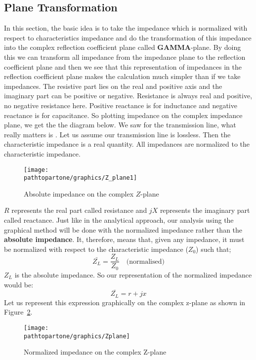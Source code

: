 \subsection{Plane Transformation}
In this section, the basic idea is to take the impedance which is normalized with respect to characteristics impedance and do the transformation of this impedance into the complex reflection coefficient plane called \textbf{GAMMA}-plane. By doing this we can transform all impedance from the impedance plane to the reflection coefficient plane and then we see that this representation of impedances in the reflection coefficient plane makes the calculation much simpler than if we take impedances. The resistive part lies on the real and positive axis and the imaginary part can be positive or negative. Resistance is always real and positive, no negative resistance here. Positive reactance is for inductance and negative reactance is for capacitance. So plotting impedance on the complex impedance plane, we get the the diagram below. We saw for the transmission line, what really matters is . Let us assume our transmission line is lossless. Then the characteristic impedance is a real quantity. All impedances are normalized to the characteristic impedance.
\begin{figure}[h]
\centering
\texttt{[image: \\pathtopartone/graphics/Z\_plane1]}
\caption{Absolute impedance on the complex $Z$-plane}
\label{fig:mjhdj}
\end{figure}

$R$ represents the real part called resistance and $jX$ represents the imaginary part called reactance. Just like in the analytical approach, our analysis using the graphical method will be done with the normalized impedance rather than the \textbf{absolute impedance}. It, therefore, means that, given any impedance, it must be normalized with respect to the characteristic impedance ($Z_0$) such that;
\begin{equation*}
\bar{Z_L}=\frac{Z_L}{Z_0} \quad \text{(normalised)}
\end{equation*}
$Z_L$ is the absolute impedance. So our representation of the normalized impedance would be:
\begin{equation*}
\bar{Z_L}= r + jx
\end{equation*}
Let us represent this expression graphically on the complex z-plane as shown in Figure~\ref{fig:transline2}.
\begin{figure}[h]
\center\texttt{[image: \\pathtopartone/graphics/Zplane]}
\caption{Normalized impedance on the complex Z-plane}
\label{fig:transline2}
\end{figure}

